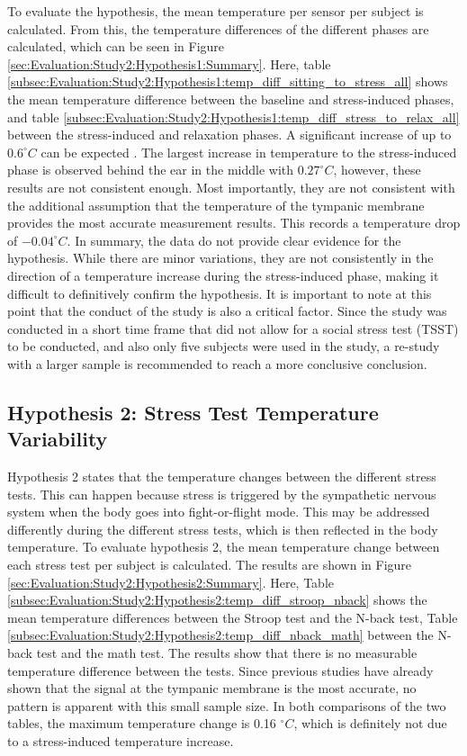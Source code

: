 To evaluate the hypothesis, the mean temperature per sensor per subject is calculated.
From this, the temperature differences of the different phases are calculated, which can be seen in Figure \ref{sec:Evaluation:Study2:Hypothesis1:Summary}.
Here, table \ref{subsec:Evaluation:Study2:Hypothesis1:temp_diff_sitting_to_stress_all} shows the mean temperature difference between the baseline and stress-induced phases, and table \ref{subsec:Evaluation:Study2:Hypothesis1:temp_diff_stress_to_relax_all} between the stress-induced and relaxation phases.
A significant increase of up to $0.6 ^\circ C$ can be expected \cite{vinkersEffectStressCore2013, okaMechanismsMediatorsPsychological2001, marksNonshiveringThermogenesisInterscapular2009}.
The largest increase in temperature to the stress-induced phase is observed behind the ear in the middle with $0.27 ^\circ C$, however, these results are not consistent enough. 
Most importantly, they are not consistent with the additional assumption that the temperature of the tympanic membrane provides the most accurate measurement results.
This records a temperature drop of $-0.04 ^\circ C$.
In summary, the data do not provide clear evidence for the hypothesis. 
While there are minor variations, they are not consistently in the direction of a temperature increase during the stress-induced phase, making it difficult to definitively confirm the hypothesis. 
It is important to note at this point that the conduct of the study is also a critical factor. 
Since the study was conducted in a short time frame that did not allow for a social stress test (TSST) to be conducted, and also only five subjects were used in the study, a re-study with a larger sample is recommended to reach a more conclusive conclusion.

\subsection{Hypothesis 2: Stress Test Temperature Variability}
\label{subsec:Evaluation:Study2:Hypothesis2}
Hypothesis 2 states that the temperature changes between the different stress tests. 
This can happen because stress is triggered by the sympathetic nervous system when the body goes into fight-or-flight mode.
This may be addressed differently during the different stress tests, which is then reflected in the body temperature.
To evaluate hypothesis 2, the mean temperature change between each stress test per subject is calculated.
The results are shown in Figure \ref{sec:Evaluation:Study2:Hypothesis2:Summary}. 
Here, Table \ref{subsec:Evaluation:Study2:Hypothesis2:temp_diff_stroop_nback} shows the mean temperature differences between the Stroop test and the N-back test, Table \ref{subsec:Evaluation:Study2:Hypothesis2:temp_diff_nback_math} between the N-back test and the math test.
The results show that there is no measurable temperature difference between the tests.
Since previous studies have already shown that the signal at the tympanic membrane is the most accurate, no pattern is apparent with this small sample size.
In both comparisons of the two tables, the maximum temperature change is 0.16 $ ^\circ C$, which is definitely not due to a stress-induced temperature increase.

